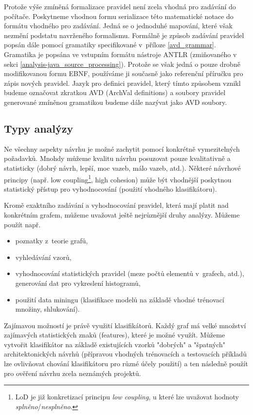 Protože výše zmíněná formalizace pravidel není zcela vhodná pro zadávání do počítače. Poskytneme vhodnou formu serializace této matematické notace do formátu vhodného pro zadávání. Jedná se o jednoduhé mapování, které však nezmění podstatu navrženého formalismu. Formálně je způsob zadávání pravidel popsán dále pomocí gramatiky specifikované v~příloze \ref{avd_grammar}. Gramatika je popsána ve vstupním formátu nástroje ANTLR (zmiňovaného v sekci \ref{analysis-java_source_processing}). Protože se však jedná o pouze drobně modifikovanou formu EBNF, používáme ji současně jako referenční příručku pro zápis nových pravidel. Jazyk pro definici pravidel, který tímto způsobem vznikl budeme označovat zkratkou AVD (ArchVal definitions) a soubory pravidel generované zmíněnou gramatikou budeme dále nazývat jako AVD soubory.

\subsection{Typy analýzy}

Ne všechny aspekty návrhu je možné zachytit pomocí konkrétně vymezitelných požadavků.  Mnohdy můžeme kvalitu návrhu posuzovat pouze kvalitativně a statisticky (dobrý návrh, lepší, moc vazeb, málo vazeb, atd.). Některé návrhové principy (např. low coupling\footnote{LoD je již konkretizací principu \emph{low coupling}, u které lze uvažovat hodnoty \emph{splněno}/\emph{nesplněno}.}, high cohesion) může být vhodnější poskytnou statistický přístup pro vyhodnocování (použití vhodného klasifikátoru).

Kromě exaktního zadávání a vyhodnocování pravidel, která mají platit nad konkrétním grafem, můžeme uvažovat ještě nejrůznější druhy analýzy. Můžeme použít např.

\begin{itemize}
\item poznatky z~teorie grafů,
\item vyhledávání vzorů,
\item vyhodnocování statistických pravidel (meze počtů elementů v~grafech, atd.), generování dat pro vykreslení histogramů,
\item použití data miningu (klasifikace modelů na základě vhodné trénovací množiny, shlukování).
\end{itemize}

Zajímavou možností je právě využití klasifikátorů. Každý graf má velké množství zajímavých statistických znaků (features), které je možné využít. Můžeme vytvořit klasifikátor na základě existujících vzorků "dobrých" a "špatných" architektonických návrhů (přípravou vhodných trénovacích a testovacích příkladů lze ovlivňovat chování klasifikátoru pro různé účely použití) a ten následně použít pro ověření návrhu zcela neznámých projektů.

